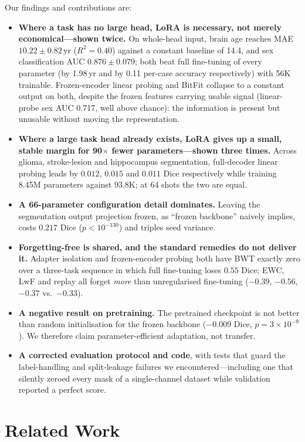 \documentclass[journal,twoside,web]{ieeecolor}
\begin{document}
Our findings and contributions are:
\begin{itemize}
\item \textbf{Where a task has no large head, LoRA is necessary, not merely economical---shown twice.} On whole-head input, brain age reaches MAE $10.22\pm0.82$\,yr ($R^2=0.40$) against a constant baseline of 14.4, and sex classification AUC $0.876\pm0.079$; both beat full fine-tuning of every parameter (by 1.98\,yr and by 0.11 per-case accuracy respectively) with 56K trainable. Frozen-encoder linear probing and BitFit collapse to a constant output on both, despite the frozen features carrying usable signal (linear-probe sex AUC 0.717, well above chance): the information is present but unusable without moving the representation.
\item \textbf{Where a large task head already exists, LoRA gives up a small, stable margin for 90$\times$ fewer parameters---shown three times.} Across glioma, stroke-lesion and hippocampus segmentation, full-decoder linear probing leads by $0.012$, $0.015$ and $0.011$ Dice respectively while training 8.45M parameters against 93.8K; at 64 shots the two are equal.
\item \textbf{A 66-parameter configuration detail dominates.} Leaving the segmentation output projection frozen, as ``frozen backbone'' naively implies, costs $0.217$ Dice ($p<10^{-130}$) and triples seed variance.
\item \textbf{Forgetting-free is shared, and the standard remedies do not deliver it.} Adapter isolation and frozen-encoder probing both have BWT exactly zero over a three-task sequence in which full fine-tuning loses $0.55$ Dice; EWC, LwF and replay all forget \emph{more} than unregularised fine-tuning ($-0.39$, $-0.56$, $-0.37$ vs.\ $-0.33$).
\item \textbf{A negative result on pretraining.} The pretrained checkpoint is not better than random initialisation for the frozen backbone ($-0.009$ Dice, $p=3{\times}10^{-9}$). We therefore claim parameter-efficient adaptation, not transfer.
\item \textbf{A corrected evaluation protocol and code}, with tests that guard the label-handling and split-leakage failures we encountered---including one that silently zeroed every mask of a single-channel dataset while validation reported a perfect score.
\end{itemize}


\section{Related Work}
\label{sec:related}
\end{document}
